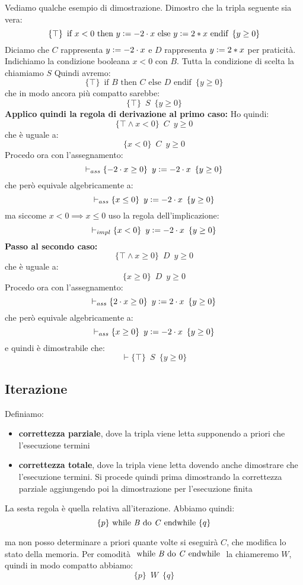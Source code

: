\begin{esempio}
	Vediamo qualche esempio di dimostrazione. Dimostro che la tripla seguente sia
	vera:
	\[\{\top\}\,\,\,\mbox{if } x<0 \mbox{ then }y\cceq -2\cdot x \mbox{ else }
		y\cceq 2*x\mbox{ endif}\,\,\,\{y\geq 0\}\]
		Diciamo che $C$ rappresenta $y\cceq -2\cdot x$ e $D$ rappresenta $y\cceq 2*x$
		per praticità. Indichiamo la condizione booleana $x<0$ con $B$. Tutta la
		condizione di scelta la chiamiamo $S$
		Quindi avremo:
		\[\{\top\}\,\,\,\mbox{if } B \mbox{ then }C\mbox{ else }
			D \mbox{ endif}\,\,\,\{y\geq 0\}\]
			che in modo ancora più compatto sarebbe:
			\[\{\top\}\,\,\,S\,\,\,\{y\geq 0\}\]
			\textbf{Applico quindi la regola di derivazione al primo caso:}
			Ho quindi:
			\[\{\top \land x<0\}\,\,\,C\,\,\,{y\geq 0}\]
			che è uguale a:
			\[\{x<0\}\,\,\,C\,\,\,{y\geq 0}\]
			Procedo ora con l'assegnamento:
			\[\vdash_{ass}\{-2\cdot x\geq 0\}\,\,\,y\cceq -2\cdot x\,\,\,\{y\geq 0\}\]
			che però equivale algebricamente a:
			\[\vdash_{ass}\{x\leq 0\}\,\,\,y\cceq -2\cdot x\,\,\,\{y\geq 0\}\]
			ma siccome $x<0 \implies x\leq 0$ uso la regola dell'implicazione:
			\[\vdash_{impl}\{x< 0\}\,\,\,y\cceq -2\cdot x\,\,\,\{y\geq 0\}\]
			\textbf{Passo al secondo caso:}
			\[\{\top \land x\geq 0\}\,\,\,D\,\,\,{y\geq 0}\]
			che è uguale a:
			\[\{x\geq 0\}\,\,\,D\,\,\,{y\geq 0}\]
			Procedo ora con l'assegnamento:
			\[\vdash_{ass}\{2\cdot x\geq 0\}\,\,\,y\cceq 2\cdot x\,\,\,\{y\geq 0\}\]
			che però equivale algebricamente a:
			\[\vdash_{ass}\{x\geq 0\}\,\,\,y\cceq -2\cdot x\,\,\,\{y\geq 0\}\]
			e quindi è dimostrabile che:
			\[\vdash \{\top\}\,\,\,S\,\,\,\{y\geq 0\}\]
			\end{esempio}
			\subsection{Iterazione}
			\begin{definizione}
				Definiamo:
				\begin{itemize}
					\item \textbf{correttezza parziale}, dove la tripla viene letta supponendo a
					      priori che l'esecuzione termini
					\item \textbf{correttezza totale}, dove la tripla viene letta dovendo anche
					      dimostrare che l'esecuzione termini. Si procede quindi prima dimostrando la
					      correttezza parziale aggiungendo poi la dimostrazione per l'esecuzione
					      finita
				\end{itemize}
			\end{definizione}
			\begin{definizione}
				La sesta regola è quella relativa all'iterazione. Abbiamo quindi:
				\[\{p\}\mbox{ while \textit{B} do \textit{C} endwhile }\{q\}\]
			\end{definizione}
			ma non posso determinare a priori quante volte si eseguirà $C$, che modifica
			lo stato della memoria. Per comodità $\mbox{ while \textit{B} do \textit{C}
			endwhile }$ la chiameremo $W$, quindi in modo compatto abbiamo:
			\[\{p\}\,\,\,W\,\,\,\{q\}\]

